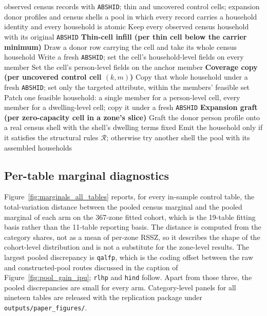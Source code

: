\documentclass[review]{elsarticle}
\begin{document}
\begin{algorithm}[H]
\caption{Household assembly in the constructed pool}
\begin{algorithmic}[1]
\Require observed census records with \texttt{ABSHID}; thin and uncovered control cells; expansion donor profiles and census shells
\Ensure a pool in which every record carries a household identity and every household is atomic
\State Keep every observed census household with its original \texttt{ABSHID}
\Statex \textbf{Thin-cell infill (per thin cell below the carrier minimum)}
    \State Draw a donor row carrying the cell and take its whole census household
    \State Write a fresh \texttt{ABSHID}; set the cell's household-level fields on every member
    \State Set the cell's person-level fields on the anchor member
\EndFor
\Statex \textbf{Coverage copy (per uncovered control cell $(k,m)$)}
        \State Copy that whole household under a fresh \texttt{ABSHID}; set only the targeted attribute, within the members' feasible set
    \Else
        \State Patch one feasible household: a single member for a person-level cell, every member for a dwelling-level cell; copy it under a fresh \texttt{ABSHID}
    \EndIf
\EndFor
\Statex \textbf{Expansion graft (per zero-capacity cell in a zone's slice)}
    \State Graft the donor person profile onto a real census shell with the shell's dwelling terms fixed
    \State Emit the household only if it satisfies the structural rules $\mathcal{R}$; otherwise try another shell
\EndFor
\State \Return the pool with its assembled households
\end{algorithmic}
\label{alg:table}
\end{algorithm}




\subsection{Per-table marginal diagnostics}
\label{sec:appendix_marginals}
Figure~\ref{fig:marginals_all_tables} reports, for every in-sample control table, the
total-variation distance between the pooled census marginal and the pooled marginal of each
arm on the 367-zone fitted cohort, which is the 19-table fitting basis rather than the
11-table reporting basis. The distance is computed
from the category shares, not as a mean of per-zone RSSZ, so it describes the shape of the
cohort-level distribution and is not a substitute for the zone-level results. The largest
pooled discrepancy is \texttt{qalfp}, which is the coding offset between the raw and
constructed-pool routes discussed in the caption of Figure~\ref{fig:pool_gain_ipu};
\texttt{rlhp} and \texttt{hind} follow. Apart from those three, the pooled discrepancies are small for every arm. Category-level panels for all nineteen tables are released with the
replication package under \texttt{outputs/paper\_figures/}.
\end{document}
